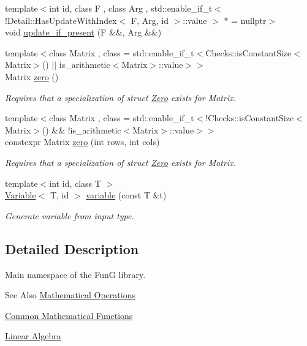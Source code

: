 \begin{DoxyCompactItemize}
{\footnotesize template$<$int id, class F , class Arg , std\-::enable\-\_\-if\-\_\-t$<$!\-Detail\-::\-Has\-Update\-With\-Index$<$ F, Arg, id $>$\-::value $>$ $\ast$  = nullptr$>$ }\\void \hyperlink{namespaceFunG_aed5ddbef97c98202e818bca2b74c75d2}{update\-\_\-if\-\_\-present} (F \&\&, Arg \&\&)
\item 
{\footnotesize template$<$class Matrix , class  = std\-::enable\-\_\-if\-\_\-t$<$\-Checks\-::is\-Constant\-Size$<$\-Matrix$>$() $\vert$$\vert$ is\-\_\-arithmetic$<$\-Matrix$>$\-::value$>$$>$ }\\Matrix \hyperlink{namespaceFunG_a649b4470d6def401959bfea3a368c48c}{zero} ()
\begin{DoxyCompactList}\small\item\em Requires that a specialization of struct \hyperlink{structFunG_1_1Zero}{Zero} exists for Matrix. \end{DoxyCompactList}\item 
{\footnotesize template$<$class Matrix , class  = std\-::enable\-\_\-if\-\_\-t$<$!\-Checks\-::is\-Constant\-Size$<$\-Matrix$>$() \&\& !is\-\_\-arithmetic$<$\-Matrix$>$\-::value$>$$>$ }\\constexpr Matrix \hyperlink{namespaceFunG_ae633433339ba30207aa526e54e3924b4}{zero} (int rows, int cols)
\begin{DoxyCompactList}\small\item\em Requires that a specialization of struct \hyperlink{structFunG_1_1Zero}{Zero} exists for Matrix. \end{DoxyCompactList}\item 
{\footnotesize template$<$int id, class T $>$ }\\\hyperlink{structFunG_1_1Variable}{Variable}$<$ T, id $>$ \hyperlink{namespaceFunG_a2ead025b35a8cdf3ac8c170524ab61c0}{variable} (const T \&t)
\begin{DoxyCompactList}\small\item\em Generate variable from input type. \end{DoxyCompactList}\end{DoxyCompactItemize}


\subsection{Detailed Description}
Main namespace of the Fun\-G library. \begin{DoxySeeAlso}{See Also}
\hyperlink{group__MathematicalOperationsGroup}{Mathematical Operations} 

\hyperlink{group__CMathGroup}{Common Mathematical Functions} 

\hyperlink{group__LinearAlgebraGroup}{Linear Algebra} 
\end{DoxySeeAlso}


